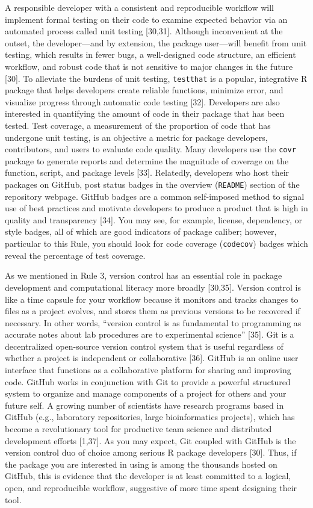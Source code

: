 \documentclass[10pt,letterpaper]{article}
\begin{document}
A responsible developer with a consistent and reproducible workflow will
implement formal testing on their code to examine expected behavior via
an automated process called unit testing {[}30,31{]}. Although
inconvenient at the outset, the developer---and by extension, the
package user---will benefit from unit testing, which results in fewer
bugs, a well-designed code structure, an efficient workflow, and robust
code that is not sensitive to major changes in the future {[}30{]}. To
alleviate the burdens of unit testing, \texttt{testthat} is a popular,
integrative R package that helps developers create reliable functions,
minimize error, and visualize progress through automatic code testing
{[}32{]}. Developers are also interested in quantifying the amount of
code in their package that has been tested. Test coverage, a measurement
of the proportion of code that has undergone unit testing, is an
objective a metric for package developers, contributors, and users to
evaluate code quality. Many developers use the \texttt{covr} package to
generate reports and determine the magnitude of coverage on the
function, script, and package levels {[}33{]}. Relatedly, developers who
host their packages on GitHub, post status badges in the overview
(\texttt{README}) section of the repository webpage. GitHub badges are a
common self-imposed method to signal use of best practices and motivate
developers to produce a product that is high in quality and transparency
{[}34{]}. You may see, for example, license, dependency, or style
badges, all of which are good indicators of package caliber; however,
particular to this Rule, you should look for code coverage
(\texttt{codecov}) badges which reveal the percentage of test coverage.

As we mentioned in Rule 3, version control has an essential role in
package development and computational literacy more broadly {[}30,35{]}.
Version control is like a time capsule for your workflow because it
monitors and tracks changes to files as a project evolves, and stores
them as previous versions to be recovered if necessary. In other words,
``version control is as fundamental to programming as accurate notes
about lab procedures are to experimental science'' {[}35{]}. Git is a
decentralized open-source version control system that is useful
regardless of whether a project is independent or collaborative
{[}36{]}. GitHub is an online user interface that functions as a
collaborative platform for sharing and improving code. GitHub works in
conjunction with Git to provide a powerful structured system to organize
and manage components of a project for others and your future self. A
growing number of scientists have research programs based in GitHub
(e.g., laboratory repositories, large bioinformatics projects), which
has become a revolutionary tool for productive team science and
distributed development efforts {[}1,37{]}. As you may expect, Git
coupled with GitHub is the version control duo of choice among serious R
package developers {[}30{]}. Thus, if the package you are interested in
using is among the thousands hosted on GitHub, this is evidence that the
developer is at least committed to a logical, open, and reproducible
workflow, suggestive of more time spent designing their tool.
\end{document}
